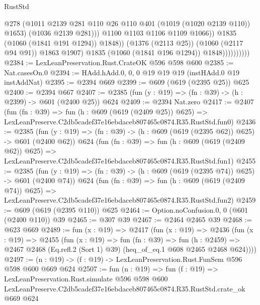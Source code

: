 \begin{lexlean}{RustStd}
\begin{coremodule}
                                      @278
                                      (@1011
                                        @2139
                                        @281
                                        @110
                                        @26
                                        @110
                                        @401
                                        (@1019 (@1020 @2139 @110))
                                        @1653)
                                      (@1036 @2139 @281)))
                                  @1100
                                  @1103
                                  @1106
                                  @1109
                                  @1066))
                              @1835
                              (@1060 (@1841 @191 @1294))
                              @1848))
                          (@1376 (@2113 @25))
                          (@1060 (@2117 @94 @91))
                          @1863
                          @1907)
                        @1835
                        (@1060 (@1841 @196 @1294))
                        @1848))))))))))
@2384 := LexLeanPreservation.Rust.CrateOK @596 @598 @600
@2385 := Nat.casesOn.{0}
@2394 := HAdd.hAdd.{0, 0, 0} @19 @19 @19 (instHAdd.{0} @19 instAddNat)
@2395 := @2394 @669
@2399 := @609 (@619 (@2395 @25)) @625
@2400 := @2394 @667
@2407 := @2385 (fun (y : @19) => (fn : @39) -> (h : @2399) -> @601 (@2400 @25)) @624
@2409 := @2394 Nat.zero
@2417 := @2407
    (fun (fn : @39) =>
    fun (h : @609 (@619 (@2409 @25)) @625) =>
    LexLeanPreserve.C2db5cadef37e16ebdaceb807465c0874.R35.RustStd.fun0)
@2436 := @2385
    (fun (y : @19) => (fn : @39) -> (h : @609 (@619 (@2395 @62)) @625) -> @601 (@2400 @62))
    @624
    (fun (fn : @39) =>
    fun (h : @609 (@619 (@2409 @62)) @625) =>
    LexLeanPreserve.C2db5cadef37e16ebdaceb807465c0874.R35.RustStd.fun1)
@2455 := @2385
    (fun (y : @19) => (fn : @39) -> (h : @609 (@619 (@2395 @74)) @625) -> @601 (@2400 @74))
    @624
    (fun (fn : @39) =>
    fun (h : @609 (@619 (@2409 @74)) @625) =>
    LexLeanPreserve.C2db5cadef37e16ebdaceb807465c0874.R35.RustStd.fun2)
@2459 := @609 (@619 (@2395 @110)) @625
@2464 := Option.noConfusion.{0, 0} (@601 (@2400 @110)) @39
@2465 := @307 @39
@2467 := @2464 @2465 @39
@2468 := @623 @669
@2489 := fun (x : @19) =>
  @2417
    (fun (x : @19) =>
    @2436
      (fun (x : @19) =>
      @2455
        (fun (x : @19) =>
        fun (fn : @39) =>
        fun (h : @2459) =>
        @2467 @2468 (Eq.refl.{2} (Sort 1) @39) (heq_of_eq.{1} @608 @2465 @2468 @624))))
@2497 := (n : @19) -> (f : @19) -> LexLeanPreservation.Rust.FunSem @596 @598 @600 @669 @624
@2507 := fun (n : @19) =>
  fun (f : @19) =>
  LexLeanPreservation.Rust.simulate
    @596
    @598
    @600
    LexLeanPreserve.C2db5cadef37e16ebdaceb807465c0874.R35.RustStd.crate_ok
    @669
    @624
\end{coremodule}
\end{lexlean}
